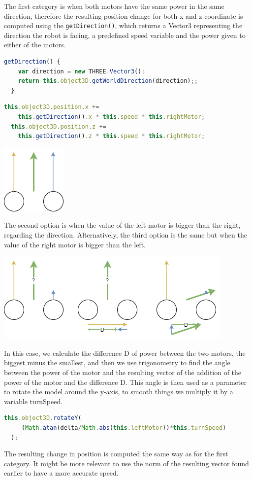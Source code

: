 \documentclass{scrbook}
\begin{document}
The first category is when both motors have the same power in the same direction, therefore the resulting position change for both x and z coordinate is computed using the \texttt{getDirection()}, which returns 
a Vector3 representing the direction the robot is facing, a predefined speed variable and the power given to either of the motors.
\begin{lstlisting}[language=JavaScript, gobble=2, basicstyle=\ttfamily\small]
  getDirection() {
    var direction = new THREE.Vector3();
    return this.object3D.getWorldDirection(direction);;
  }
\end{lstlisting} 
\begin{lstlisting}[language=JavaScript, basicstyle=\ttfamily\small]
  this.object3D.position.x += 
    this.getDirection().x * this.speed * this.rightMotor;
  this.object3D.position.z +=
    this.getDirection().z * this.speed * this.rightMotor;
\end{lstlisting}  
\begin{center}
  \includegraphics[scale=0.8]{./move_spsd}
\end{center}

The second option is when the value of the left motor is bigger than the right, regarding the direction. Alternatively, the third option is the same but when the value of the right motor is bigger than the left.
\begin{center}
  \includegraphics[width=\textwidth]{./move_dp}
\end{center}
In this case, we calculate the difference D of power between the two motors, the biggest minus the smallest, and then we use trigonometry to find the angle between the power of the motor and the resulting vector of the addition of the power of the motor and the difference D.
This angle is then used as a parameter to rotate the model around the y-axis, to smooth things we multiply it by a variable turnSpeed.  
\begin{lstlisting}[language=JavaScript, basicstyle=\ttfamily\small]
  this.object3D.rotateY(
    -(Math.atan(delta/Math.abs(this.leftMotor))*this.turnSpeed)
  );
\end{lstlisting} 
The resulting change in position is computed the same way as for the first category. It might be more relevant to use the norm of the resulting vector 
found earlier to have a more accurate speed.
\end{document}
